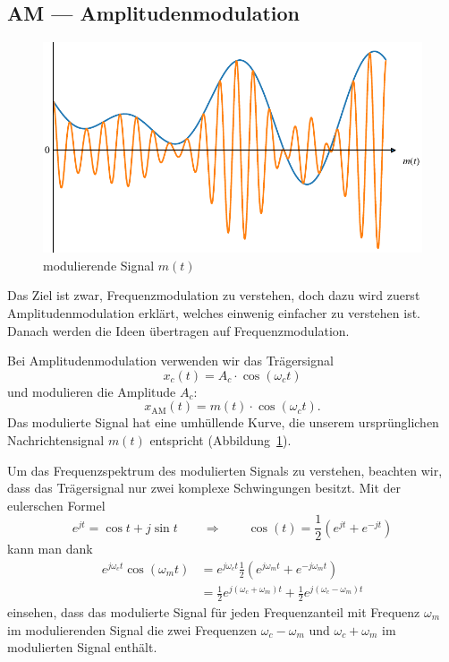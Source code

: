 %
%
%
\subsection{AM --- Amplitudenmodulation\label{fm:section:teil0}}
\begin{figure}
	\centering
	\includegraphics{papers/fm/images/amnormal.pdf}
	\caption{modulierende Signal \(m(t)\)}
	\label{fig:modulierend}
\end{figure}
Das Ziel ist zwar, Frequenzmodulation zu verstehen, doch dazu wird
zuerst Amplitudenmodulation erklärt, welches einwenig einfacher zu
verstehen ist.
Danach werden die Ideen übertragen auf Frequenzmodulation.

Bei Amplitudenmodulation verwenden wir das Trägersignal
\[
    x_c(t) = A_c \cdot \cos(\omega_ct)
\]
und modulieren die Amplitude \(A_c\):
\[
    x_{\text{AM}}(t) = m(t) \cdot \cos(\omega_ct).
\]
Das modulierte Signal hat eine umhüllende Kurve, die unserem
ursprünglichen Nachrichtensignal \(m(t)\) entspricht
(Abbildung~\ref{fig:modulierend}).

Um das Frequenzspektrum des modulierten Signals zu verstehen,
beachten wir, dass das Trägersignal nur zwei komplexe Schwingungen
besitzt. 
Mit der eulerschen Formel
\begin{equation}
e^{jt}
=
\cos t+j\sin t
\qquad\Rightarrow\qquad
\cos(t) = \frac12 (e^{jt} + e^{-jt})
\label{fm:eq:AM:euler}
\end{equation}
kann man dank
\begin{align}
e^{j\omega_c t} \cos(\omega_m t)
&=
e^{j\omega_c t}\frac12(e^{j\omega_m t} + e^{-j\omega_m t})
\\
&=
\frac12
e^{j(\omega_c+\omega_m) t}
+
\frac12
e^{j(\omega_c-\omega_m) t}
\label{fm:eq:am}
\end{align}
einsehen, dass das modulierte Signal für jeden Frequenzanteil
mit Frequenz $\omega_m$ im modulierenden Signal
die zwei Frequenzen $\omega_c-\omega_m$ und
$\omega_c+\omega_m$ im modulierten Signal enthält.

